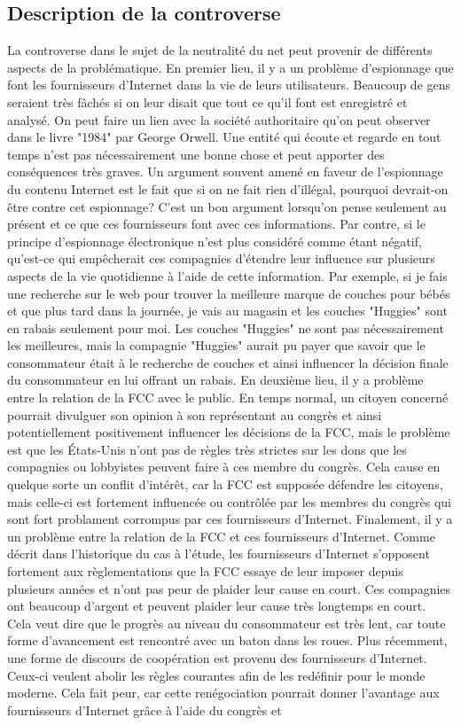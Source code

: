 \documentclass[12pt]{article}
\begin{document}
\subsection{Description de la controverse}
La controverse dans le sujet de la neutralité du net peut provenir de différents aspects de la problématique. En premier lieu, il y a un problème d'espionnage que font les fournisseurs d'Internet dans la vie de leurs utilisateurs. Beaucoup de gens seraient très fâchés si on leur disait que tout ce qu'il font est enregistré et analysé. On peut faire un lien avec la société authoritaire qu'on peut observer dans le livre "1984" par George Orwell. Une entité qui écoute et regarde en tout temps n'est pas nécessairement une bonne chose et peut apporter des conséquences très graves. Un argument souvent amené en faveur de l'espionnage du contenu Internet est le fait que si on ne fait rien d'illégal, pourquoi devrait-on être contre cet espionnage? C'est un bon argument lorsqu'on pense seulement au présent et ce que ces fournisseurs font avec ces informations. Par contre, si le principe d'espionnage électronique n'est plus considéré comme étant négatif, qu'est-ce qui empêcherait ces compagnies d'étendre leur influence sur plusieurs aspects de la vie quotidienne à l'aide de cette information. Par exemple, si je fais une recherche sur le web pour trouver la meilleure marque de couches pour bébés et que plus tard dans la journée, je vais au magasin et les couches "Huggies" sont en rabais seulement pour moi. Les couches "Huggies" ne sont pas nécessairement les meilleures, mais la compagnie "Huggies" aurait pu payer que savoir que le consommateur était à le recherche de couches et ainsi influencer la décision finale du consommateur en lui offrant un rabais. En deuxième lieu, il y a problème entre la relation de la FCC avec le public. En temps normal, un citoyen concerné pourrait divulguer son opinion à son représentant au congrès et ainsi potentiellement positivement influencer les décisions de la FCC, mais le problème est que les États-Unis n'ont pas de règles très strictes sur les dons que les compagnies ou lobbyistes peuvent faire à ces membre du congrès. Cela cause en quelque sorte un conflit d'intérêt, car la FCC est supposée défendre les citoyens, mais celle-ci est fortement influencée ou contrôlée par les membres du congrès qui sont fort problament corrompus par ces fournisseurs d'Internet. Finalement, il y a un problème entre la relation de la FCC et ces fournisseurs d'Internet. Comme décrit dans l'historique du cas à l'étude, les fournisseurs d'Internet s'opposent fortement aux règlementations que la FCC essaye de leur imposer depuis plusieurs années et n'ont pas peur de plaider leur cause en court. Ces compagnies ont beaucoup d'argent et peuvent plaider leur cause très longtemps en court. Cela veut dire que le progrès au niveau du consommateur est très lent, car toute forme d'avancement est rencontré avec un baton dans les roues. Plus récemment, une forme de discours de coopération est provenu des fournisseurs d'Internet. Ceux-ci veulent abolir les règles courantes afin de les redéfinir pour le monde moderne. Cela fait peur, car cette renégociation pourrait donner l'avantage aux fournisseurs d'Internet grâce à l'aide du congrès et 
\end{document}

